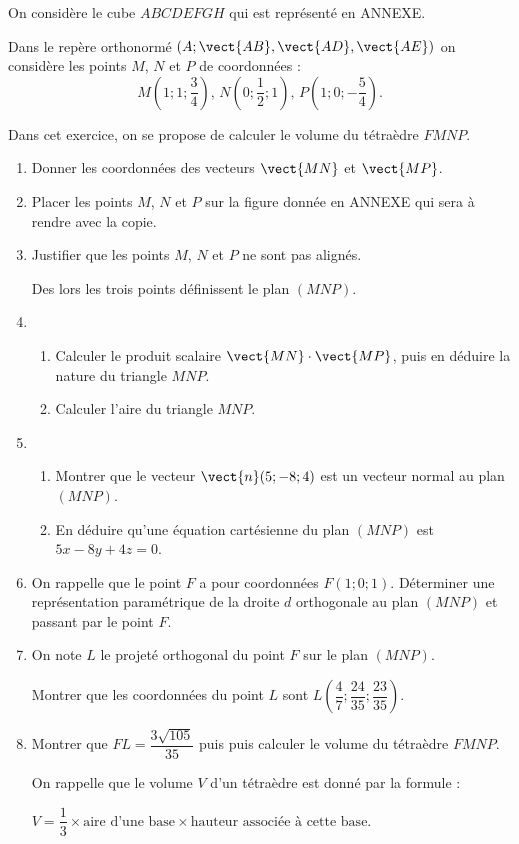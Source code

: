 On considère le cube $ABCDEFGH$ qui est représenté en ANNEXE.

Dans le repère orthonormé $\left(A;\vect{AB},\vect{AD},\vect{AE}\right)$ on considère les points $M$, $N$ et $P$ de coordonnées :
\[ M\left(1;1;\frac34\right) \text{, } N\left(0;\frac12;1\right) \text{, } P\left(1;0;-\frac54\right). \]
%

Dans cet exercice, on se propose de calculer le volume du tétraèdre $FMNP$.

\begin{enumerate}
	\item Donner les coordonnées des vecteurs $\vect{MN}$ et $\vect{MP}$.
	\item Placer les points $M$, $N$ et $P$ sur la figure donnée en ANNEXE qui sera à rendre avec la copie.
	\item Justifier que les points $M$, $N$ et $P$ ne sont pas alignés.
	
	Des lors les trois points définissent le plan $(MNP)$.
	\item 
	\begin{enumerate}
		\item Calculer le produit scalaire $\vect{MN}\cdot\vect{MP}$, puis en déduire la nature du triangle $MNP$.
		\item Calculer l'aire du triangle $MNP$.
	\end{enumerate}
	\item 
	\begin{enumerate}
		\item Montrer que le vecteur $\vect{n}(5;-8;4)$ est un vecteur normal au plan $(MNP)$.
		\item En déduire qu'une équation cartésienne du plan $(MNP)$ est $5x-8y+4z=0$.
	\end{enumerate}
	\item On rappelle que le point $F$ a pour coordonnées $F(1;0;1)$. Déterminer une représentation paramétrique de la droite $d$ orthogonale au plan $(MNP)$ et passant par le point $F$.
	\item On note $L$ le projeté orthogonal du point $F$ sur le plan $(MNP)$.
	
	Montrer que les coordonnées du point $L$ sont $L\left(\dfrac{4}{7};\dfrac{24}{35};\dfrac{23}{35}\right)$.
	\item Montrer que $FL=\dfrac{3\sqrt{105}}{35}$ puis puis calculer le volume du tétraèdre $FMNP$.
	
	On rappelle que le volume $V$ d'un tétraèdre est donné par la formule : 
	
	\hspace{5mm}$V = \dfrac13  \times \text{aire d'une base} \times \text{hauteur associée à cette base}$.
\end{enumerate}